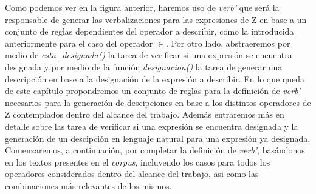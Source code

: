 Como podemos ver en la figura anterior, haremos uso de \emph{verb'} que será la responsable de generar las verbalizaciones para las expresiones de Z en base a un conjunto de reglas dependientes del operador a describir, como la introducida anteriormente para el caso del operador $\in$. Por otro lado, abstraeremos por medio de \emph{esta\_designada()} la tarea de verificar si una expresión se encuentra designada y por medio de la función \emph{designacion()} la tarea de generar una descripción en base a la designación de la expresión a describir. En lo que queda de este capítulo propondremos un conjunto de reglas para la definición de \emph{verb'} necesarios para la generación de descipciones en base a los distintos operadores de Z contemplados dentro del alcance del trabajo. Además entraremos más en detalle sobre las tarea de verificar si una expresión se encuentra designada y la generación de un descipción en lenguaje natural para una expresión ya designada. Comenzaremos, a continuación, por completar la definición de \emph{verb'}, basándonos en los textos presentes en el \emph{corpus}, incluyendo los casos para todos los operadores considerados dentro del alcance del trabajo, asi como las combinaciones más relevantes de los mismos. %

